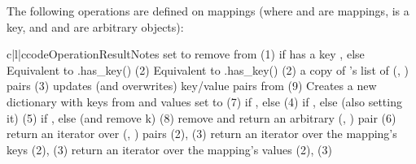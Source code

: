 The following operations are defined on mappings (where  and
 are mappings,  is a key, and  and  are
arbitrary objects):

\begin{tableiii}{c|l|c}{code}{Operation}{Result}{Notes}
          {set  to }
          {}
          {remove  from }
          {(1)}
          { if  has a key , else }
          {}
          {Equivalent to .has_key()}
          {(2)}
          {Equivalent to  .has_key()}
          {(2)}
          {a copy of 's list of (, ) pairs}
          {(3)}
          {updates (and overwrites) key/value pairs from }
          {(9)}
          {Creates a new dictionary with keys from  and values set to }
          {(7)}			   
          { if ,
           else }
          {(4)}
          { if ,
           else  (also setting it)}
          {(5)}
          { if ,
           else  (and remove k)}
          {(8)}
          {remove and return an arbitrary (, ) pair}
          {(6)}
          {return an iterator over (, ) pairs}
          {(2), (3)}
          {return an iterator over the mapping's keys}
          {(2), (3)}
          {return an iterator over the mapping's values}
          {(2), (3)}
\end{tableiii}

